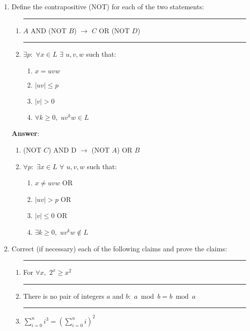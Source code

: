 \documentclass{article}%
\begin{document}
\begin{enumerate}
\begin{enumerate}
	
	\end{enumerate}
	

	
	\item Define the contrapositive (NOT) for each of the two statements:
	
	\begin{enumerate}
		\item \rule{0.5 in}{1 pt} $A$ AND (NOT $B$) $\to$ $C$ OR (NOT $D$)
		\item \rule{0.5 in}{1 pt} $\exists p:$ $\forall x \in L$ $\exists$ $u,v,w$ such that:
			\begin{enumerate}
			\item $x=uvw$
			\item $|uv| \le p$
			\item $|v|>0$
			\item $\forall k \geq 0,$ $uv^kw \in L$
		\end{enumerate}
	\end{enumerate}
	
	\textbf{Answer}:
	\begin{enumerate}
	\item  (NOT $C$) AND D $\to$ (NOT $A$) OR $B$
	\item $\forall p:$ $\exists x \in L$ $\forall$ $u,v,w$ such that:
			\begin{enumerate}
			\item $x\neq 	uvw$ OR
			\item $|uv| > p$ OR
			\item $|v|\le 0$ OR
			\item $\exists k \geq 0,$ $uv^kw \notin L$
		\end{enumerate}
	\end{enumerate}
	

	\item Correct (if necessary) each of the following claims and prove the claims:
	\begin{enumerate}
	\item \rule{0.5 in}{1 pt} For $\forall x,$ $2^x \geq x^2$
	\item \rule{0.5 in}{1 pt} There is no pair of integers $a$ and $b:$ $a\bmod b = b\bmod a$
	\item \rule{0.5 in}{1 pt} $\sum\limits_{i = 0}^n {i^3 }  = \left( {\sum\limits_{i = 0}^n i } \right)^2 $
	\end{enumerate}
	

\end{enumerate}
\end{document}
